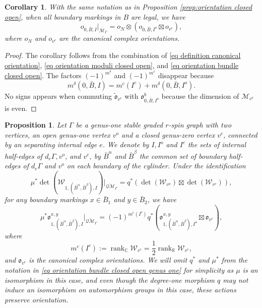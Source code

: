 \documentclass[11pt,a4paper]{article}
\newtheorem{prop}[dummy]{Proposition}
\newtheorem{cor}[dummy]{Corollary}
\theoremstyle{definition}
\theoremstyle{remark}
\newcommand{\oQMb}{{\overline{\mathcal{QM}}}}
\numberwithin{equation}{section}
\def\Mbar{{\overline{\mathcal M}}}
\begin{document}
\begin{cor}\label{cor:orientation closed open}
     With the same notation as in Proposition \ref{prop:orientation closed open}, when all boundary markings in $B$ are legal, we have 
     \begin{equation}\label{eq orientation relative closed open}
        {{o}}_{0,\bar B,I}|_{\Mbar_\Gamma} = o_N\otimes ({{o}}_{0,\bar B,I^o}\boxtimes {{o}}_{v^c}),
        \end{equation}
        where $o_N$ and ${{o}}_{v^c}$ are the canonical complex orientations.
\end{cor}
\begin{proof}
    The corollary follows from the combination of \eqref{eq definition canonical orientation}, \eqref{eq orientation moduli closed open}, and \eqref{eq orientation bundle closed open}. The factors $(-1)^{m^\delta}$ and $(-1)^{m^c}$ disappear because
    $$
    m^\delta(0,\bar B, I)=m^c(I^c)+ m^\delta(0,\bar B, I^o).
    $$
    No signs appears when commuting $ \tilde{\mathfrak{o}}_{v^c}$ with ${\mathfrak{o}}^b_{0,\bar B,I^o}$ because the dimension of $\mathcal M_{v^c}$ is even.
\end{proof}

  

\begin{prop}\label{prop:orientation bundle closed open genus one}
    Let $\Gamma$ be a genus-one  stable graded $r$-spin graph with two vertices, an open genus-one vertex $v^o$ and a closed genus-zero vertex $v^c$, connected by an separating internal edge $e$.  We denote by $I,I^o$ and $I^c$ the sets of internal half-edges of $d_e\Gamma,v^o$, and $v^c$, by $\bar B^\alpha$ and $\bar B^\beta$ the common set of boundary half-edges of $d_e\Gamma$ and $v^o$ on each boundary of the cylinder. Under the identification \begin{equation}\label{eq det decomp open close genus one}
        \mu^*\det(\mathcal W_{1,(\bar{B}^\alpha,\bar{B}^\beta),I})\big|_{\oQMb_\Gamma} =  q^*\left(\det(\mathcal W_{v^o})\boxtimes \det(\mathcal W_{v^c})\right),
    \end{equation}
    for any boundary markings $x\in \bar B_1$ and $y\in \bar B_2$, we have 
        \begin{equation}\label{eq orientation bundle closed open genus one}
        \mu^*{\mathfrak{o}}^{x,y}_{1,(\bar{B}^\alpha,\bar{B}^\beta),I}|_{\oQMb_\Gamma} = (-1)^{m^c(I^c)}q^*\left({\mathfrak{o}}^{x,y}_{1,(\bar{B}^\alpha,\bar{B}^\beta),I^o}\boxtimes {\mathfrak{o}}_{v^c}\right),
        \end{equation}
       where  
        $$
        m^c(I^c):=\operatorname{rank}_{\mathbb C} \mathcal W_{v^c}=\frac{1}{2}\operatorname{rank}_{\mathbb R} \mathcal W_{v^c},
        $$
        and ${\mathfrak{o}}_{v^c}$ is the canonical complex orientations. We will omit $q^*$ and $\mu^*$ from the notation in \eqref{eq orientation bundle closed open genus one} for simplicity as $\mu$ is an isomorphism in this case, and even though the degree-one morphism $q$ may not  induce an isomorphism on automorphism groups in this case, these actions preserve orientation.

\end{prop}
\end{document}
